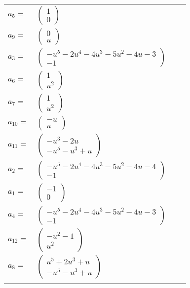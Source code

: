 \documentclass[1p]{elsarticle_modified}
\theoremstyle{definition}
\begin{document}
\begin{tabular}{m{7pt} m{180pt} m{7pt} m{180pt} }
\flushright $a_{5}=$&$\begin{pmatrix}1\\0\end{pmatrix}$ \\
\flushright $a_{9}=$&$\begin{pmatrix}0\\u\end{pmatrix}$ \\
\flushright $a_{3}=$&$\begin{pmatrix}- u^5-2 u^4-4 u^3-5 u^2-4 u-3\\-1\end{pmatrix}$ \\
\flushright $a_{6}=$&$\begin{pmatrix}1\\u^2\end{pmatrix}$ \\
\flushright $a_{7}=$&$\begin{pmatrix}1\\u^2\end{pmatrix}$ \\
\flushright $a_{10}=$&$\begin{pmatrix}- u\\u\end{pmatrix}$ \\
\flushright $a_{11}=$&$\begin{pmatrix}- u^3-2 u\\- u^5- u^3+u\end{pmatrix}$ \\
\flushright $a_{2}=$&$\begin{pmatrix}- u^5-2 u^4-4 u^3-5 u^2-4 u-4\\-1\end{pmatrix}$ \\
\flushright $a_{1}=$&$\begin{pmatrix}-1\\0\end{pmatrix}$ \\
\flushright $a_{4}=$&$\begin{pmatrix}- u^5-2 u^4-4 u^3-5 u^2-4 u-3\\-1\end{pmatrix}$ \\
\flushright $a_{12}=$&$\begin{pmatrix}- u^2-1\\u^2\end{pmatrix}$ \\
\flushright $a_{8}=$&$\begin{pmatrix}u^5+2 u^3+u\\- u^5- u^3+u\end{pmatrix}$\\&\end{tabular}
\end{document}
